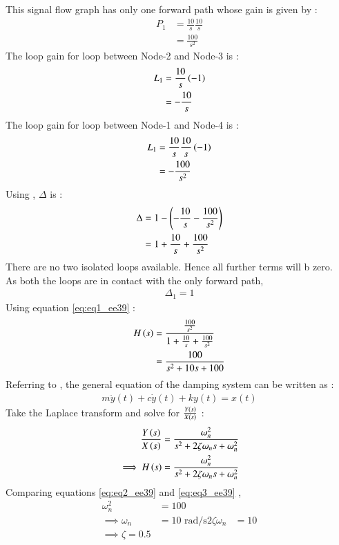 \documentclass[journal,12pt,twocolumn]{IEEEtran}
\theoremstyle{remark}
\begin{document}


This signal flow graph has only one forward path whose gain is given by :
\begin{align}
    P_1 &= \frac{10}{s} \frac{10}{s}\\
    &= \frac{100}{s^2}
\end{align}
The loop gain for loop between Node-2 and Node-3 is :
\begin{align}
    L_1 &= \frac{10}{s}\left(-1\right)\\
    &= -\frac{10}{s}
\end{align}
The loop gain for loop between Node-1 and Node-4 is :
\begin{align}
    L_1 &= \frac{10}{s}\frac{10}{s}\left(-1\right)\\
    &= -\frac{100}{s^2}
\end{align}
Using , $\Delta$ is :
\begin{align}
    \Delta &= 1 - \left(-\frac{10}{s} - \frac{100}{s^2}\right)\\
    &= 1 + \frac{10}{s} + \frac{100}{s^2}
\end{align}
There are no two isolated loops available. Hence all further terms will b zero.\\
As both the loops are in contact with the only forward path,
\begin{align}
    \Delta_1 = 1
\end{align}
Using equation \eqref{eq:eq1_ee39} :
\begin{align}
    H\left(s\right) &= \frac{\frac{100}{s^2}}{1 + \frac{10}{s} + \frac{100}{s^2}} \\
    &= \frac{100}{s^2 + 10s + 100}\label{eq:eq2_ee39}
\end{align}
Referring to , the general equation of the damping system can be written as :
\begin{align}
    m\ddot{y}(t) + c\dot{y}(t) + ky(t) = x(t)
\end{align}
Take the Laplace transform and solve for $\frac{Y\left(s\right)}{X\left(s\right)}$ :
\begin{align}
    \frac{Y\left(s\right)}{X\left(s\right)} &= \frac{\omega_n^2}{s^2 + 2\zeta\omega_n s + \omega_n^2}\\
\implies H\left(s\right) &= \frac{\omega_n^2}{s^2 + 2\zeta\omega_n s + \omega_n^2} \label{eq:eq3_ee39}
\end{align}
Comparing equations \eqref{eq:eq2_ee39} and \eqref{eq:eq3_ee39} ,
\begin{align}
    \omega_n ^2 &= 100\\
    \implies \omega_n &= 10 \text{ rad/s} \label{eq:eq4_ee39}
    2\zeta \omega_n &= 10\\
    \implies \zeta = 0.5
\end{align}
\end{document}
